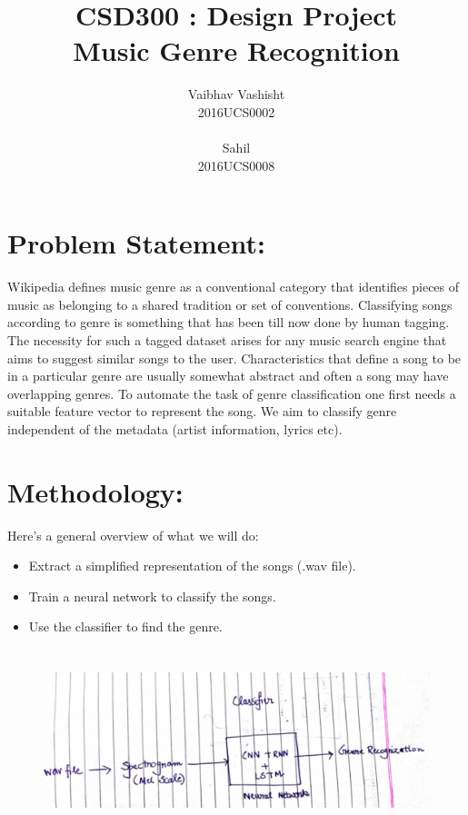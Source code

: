 \documentclass[]{report}
\title{\centering CSD300 : Design Project \\Music Genre Recognition}
\author{\LARGE Vaibhav Vashisht\\ \LARGE 2016UCS0002\\ \\ \LARGE Sahil\\ \LARGE 2016UCS0008}
\begin{document}
 

\maketitle

\section{Problem Statement:}
\large Wikipedia defines music genre as a conventional category that identifies pieces of
music as belonging to a shared tradition or set of conventions. Classifying songs
according to genre is something that has been till now done by human tagging.
The necessity for such a tagged dataset arises for any music search engine that
aims to suggest similar songs to the user. Characteristics that define a song to
be in a particular genre are usually somewhat abstract and often a song may
have overlapping genres. To automate the task of genre classification one first
needs a suitable feature vector to represent the song. We aim to classify genre
independent of the metadata (artist information, lyrics etc).

\section{Methodology:}
\large 
Here’s a general overview of what we will do:
\begin{itemize}
	\item Extract a simplified representation of the songs (.wav file).
	\item Train a neural network to classify the songs.
	\item Use the classifier to find the genre.
\end{itemize}

\begin{figure}[H]
	\vspace{0pt}
	\includegraphics[height = 150pt, keepaspectratio]{method.png}
\end{figure}
\end{document}
